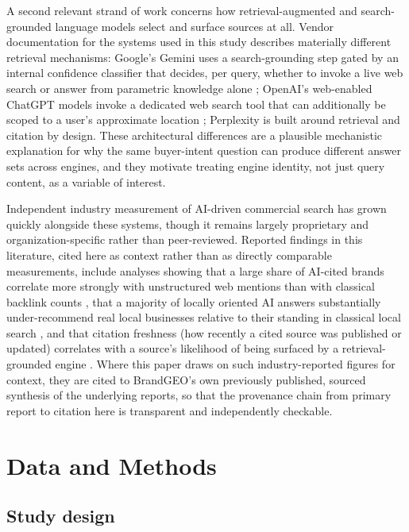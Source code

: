 \documentclass[11pt]{article}
\begin{document}
A second relevant strand of work concerns how retrieval-augmented and search-grounded
language models select and surface sources at all. Vendor documentation for the systems
used in this study describes materially different retrieval mechanisms: Google's Gemini
uses a search-grounding step gated by an internal confidence classifier that decides,
per query, whether to invoke a live web search or answer from parametric knowledge
alone \citep{googlegrounding2026}; OpenAI's web-enabled ChatGPT models invoke a
dedicated web search tool that can additionally be scoped to a user's approximate
location \citep{openaisearch2026}; Perplexity is built around retrieval and citation by
design. These architectural differences are a plausible mechanistic explanation for
why the same buyer-intent question can produce different answer sets across engines,
and they motivate treating engine identity, not just query content, as a variable of
interest.

Independent industry measurement of AI-driven commercial search has grown quickly
alongside these systems, though it remains largely proprietary and organization-specific
rather than peer-reviewed. Reported findings in this literature, cited here as
context rather than as directly comparable measurements, include analyses showing that
a large share of AI-cited brands correlate more strongly with unstructured web mentions
than with classical backlink counts \citep{ahrefs2026correlation}, that a majority of
locally oriented AI answers substantially under-recommend real local businesses
relative to their standing in classical local search \citep{soci2026}, and that citation
freshness (how recently a cited source was published or updated) correlates with a
source's likelihood of being surfaced by a retrieval-grounded engine
\citep{amsive2026, ahrefs2026freshness}. Where this paper draws on such
industry-reported figures for context, they are cited to BrandGEO's own previously
published, sourced synthesis of the underlying reports, so that the provenance chain
from primary report to citation here is transparent and independently checkable.

\section{Data and Methods}

\subsection{Study design}
\end{document}
